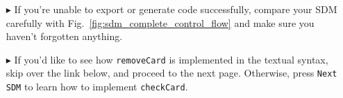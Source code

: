 \begin{itemize}
\item[$\blacktriangleright$] If you're unable to export or generate code successfully, compare your SDM carefully with Fig.~\ref{fig:sdm_complete_control_flow}
and make sure you haven't forgotten anything.

\item[$\blacktriangleright$] If you'd like to see how \texttt{removeCard} is implemented in the textual syntax, skip over the link below, and proceed to the next page. Otherwise, press 
\texttt{Next SDM} to learn how to implement \texttt{checkCard}.



\end{itemize}

